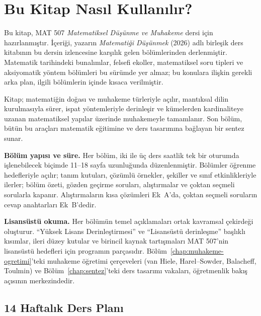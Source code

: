 \documentclass[10pt,twoside,openright]{book}
\begin{document}
\frontmatter
\hypersetup{pageanchor=true}
\tableofcontents
\clearpage

\chapter*{Bu Kitap Nasıl Kullanılır?}

Bu kitap, MAT 507 \emph{Matematiksel Düşünme ve Muhakeme} dersi için hazırlanmıştır. İçeriği, yazarın \emph{Matematiği Düşünmek} (2026) adlı birleşik ders kitabının bu dersin izlencesine karşılık gelen bölümlerinden derlenmiştir. Matematik tarihindeki bunalımlar, felsefi ekoller, matematiksel soru tipleri ve aksiyomatik yöntem bölümleri bu sürümde yer almaz; bu konulara ilişkin gerekli arka plan, ilgili bölümlerin içinde kısaca verilmiştir.

Kitap; matematiğin doğası ve muhakeme türleriyle açılır, mantıksal dilin kurulmasıyla sürer, ispat yöntemleriyle derinleşir ve kümelerden kardinaliteye uzanan matematiksel yapılar üzerinde muhakemeyle tamamlanır. Son bölüm, bütün bu araçları matematik eğitimine ve ders tasarımına bağlayan bir sentez sunar.

\begin{tcolorbox}[bookbox,colback=cGrey]
\textbf{Bölüm yapısı ve süre.} Her bölüm, iki ile üç ders saatlik tek bir oturumda işlenebilecek biçimde 11--18 sayfa uzunluğunda düzenlenmiştir. Bölümler öğrenme hedefleriyle açılır; tanım kutuları, çözümlü örnekler, şekiller ve sınıf etkinlikleriyle ilerler; bölüm özeti, gözden geçirme soruları, alıştırmalar ve çoktan seçmeli sorularla kapanır. Alıştırmaların kısa çözümleri Ek~A'da, çoktan seçmeli soruların cevap anahtarları Ek~B'dedir.
\end{tcolorbox}

\begin{tcolorbox}[bookbox,colback=cEx]
\textbf{Lisansüstü okuma.} Her bölümün temel açıklamaları ortak kavramsal çekirdeği oluşturur. ``Yüksek Lisans Derinleştirmesi'' ve ``Lisansüstü derinleşme'' başlıklı kısımlar, ileri düzey kutular ve birincil kaynak tartışmaları MAT 507'nin lisansüstü hedefleri için programın parçasıdır. Bölüm~\ref{chap:muhakeme-ogretimi}'teki muhakeme öğretimi çerçeveleri (van Hiele, Harel--Sowder, Balacheff, Toulmin) ve Bölüm~\ref{chap:sentez}'teki ders tasarımı vakaları, öğretmenlik bakış açısının merkezindedir.
\end{tcolorbox}

\section*{14 Haftalık Ders Planı}
\end{document}
